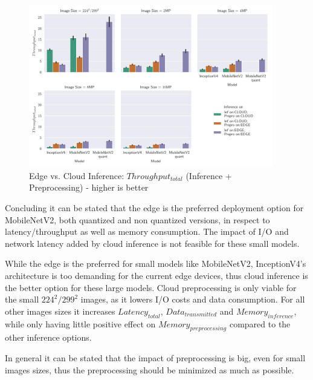 \begin{figure}[!htb]
\centering
\includegraphics[width=0.95\textwidth]{./Bilder/single_plots/edge_vs_cloud_plots/Edge_vs_Cloud_Inference_Throughput_with_Preprocessing.pdf}
\caption{Edge vs. Cloud Inference:  $Throughput_{total}$ (Inference + Preprocessing) - higher is better}
\label{fig:EdgeVsCloudTotalThroughput}
\end{figure}



Concluding it can be stated that the edge is the preferred deployment option for MobileNetV2, both quantized and non quantized versions, in respect to latency/throughput as well as memory consumption.
The impact of I/O and network latency added by cloud inference is not feasible for these small models.

While the edge is the preferred for small models like MobileNetV2, InceptionV4's architecture is too demanding for the current edge devices, thus cloud inference is the better option for these large models.
Cloud preprocessing is only viable for the small $224^2/299^2$ images, as it lowers I/O costs and data consumption. For all other images sizes it increases $Latency_{total}$, $Data_{transmitted}$ and $Memory_{inference}$, while only having little positive effect on $Memory_{preprocessing}$ compared to the other inference options.

In general it can be stated that the impact of preprocessing is big, even for small images sizes, thus the preprocessing should be minimized as much as possible.


